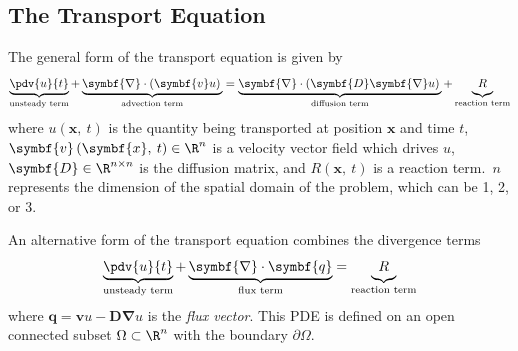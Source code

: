 \documentclass{article}
\begin{document}
\subsection{The Transport Equation}
The general form of the transport equation is given by
\begin{equation*}
    \underbrace{\pdv{u}{t}}_{\text{unsteady term}} + \underbrace{\symbf{\nabla} \cdot \left( \symbf{v} u \right) \vphantom{\pdv{u}{t}}}_{\text{advection term}} = \underbrace{\symbf{\nabla} \cdot \left( \symbf{D} \symbf{\nabla} u \right) \vphantom{\pdv{u}{t}}}_{\text{diffusion term}} + \underbrace{R \vphantom{\pdv{u}{t}}}_{\text{reaction term}}
\end{equation*}
where \(u\left( \symbf{x},\: t \right)\) is the quantity being transported
at position \(\symbf{x}\) and time \(t\), \(\symbf{v}\left( \symbf{x},\: t \right) \in \R^n\)
is a velocity vector field which drives \(u\),
\(\symbf{D} \in \R^{n \times n}\) is the diffusion matrix, and
\(R\left( \symbf{x},\: t \right)\) is a reaction term.\ \(n\) represents
the dimension of the spatial domain of the problem, which can be 1, 2,
or 3.

An alternative form of the transport equation combines the divergence
terms
\begin{equation*}
    \underbrace{\pdv{u}{t} \vphantom{\pdv{u}{t}}}_{\text{unsteady term}} + \underbrace{\symbf{\nabla} \cdot \symbf{q} \vphantom{\pdv{u}{t}}}_{\text{flux term}} = \underbrace{R \vphantom{\pdv{u}{t}}}_{\text{reaction term}}
\end{equation*}
where \(\symbf{q} = \symbf{v} u - \symbf{D} \symbf{\nabla} u\) is the
\textit{flux vector}. This PDE is defined on an open connected subset
\(\Omega \subset \R^n\) with the boundary \(\partial \Omega\).
\end{document}
